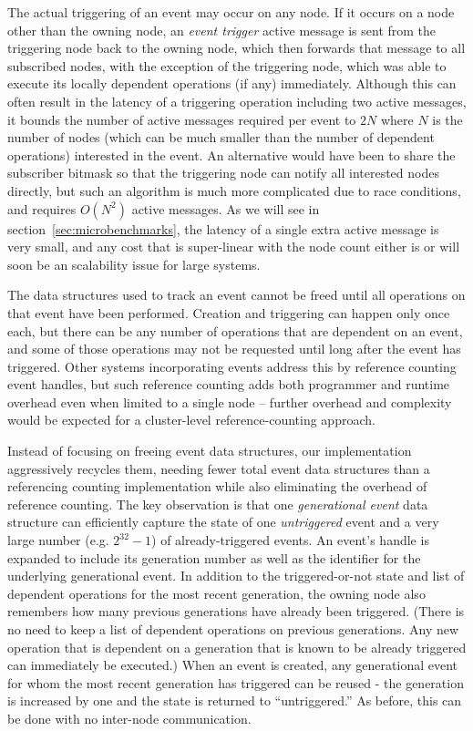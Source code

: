 The actual triggering of an event may occur on any node.  If it occurs on a node other than the owning
node, an {\em event trigger} active message is sent from the triggering node back to the owning node, which
then forwards that message to all subscribed nodes, with the exception of the triggering node, which was
able to execute its locally dependent operations (if any) immediately.  Although this can often result in
the latency of a triggering operation including two active messages, it bounds the number of active
messages required per event to $2N$ where $N$ is the number of nodes (which can be much smaller than the
number of dependent operations) interested in the event.  An alternative
would have been to share the subscriber bitmask so that the triggering node can notify all interested
nodes directly, but such an algorithm is much more complicated due to race conditions, and requires $O(N^2)$
active messages.  As we will see in section~\ref{sec:microbenchmarks}, the latency of a single extra
active message is very small, and any cost that is super-linear with the node count either is or will soon
be an scalability issue for large systems.

The data structures used to track an event cannot be freed until all operations on that event have been
performed.  Creation and triggering can happen only once each, but there can be any number of operations
that are dependent on an event, and some of those operations may not be requested until long after the
event has triggered.  Other systems incorporating events address this by reference counting event
handles\cite{Khronos:OpenCL}, but such reference counting adds both programmer and runtime overhead even when
limited to a single node -- further overhead and complexity would be expected for a cluster-level
reference-counting approach.

Instead of focusing on freeing event data structures, our implementation aggressively recycles them, 
needing fewer total event data structures than a referencing counting implementation while also eliminating
the overhead of reference counting.  The key observation is that one {\em generational event} data structure
 can efficiently capture the state of one {\em untriggered} event and a very large number (e.g. $2^{32}-1$)
of already-triggered events.  An event's handle is expanded to include its generation number as well as the
identifier for the underlying generational event.  In addition to the triggered-or-not state and list of
dependent operations
for the most recent generation, the owning node also remembers how many previous generations have already
been triggered.  (There is no need to keep a list of dependent operations on previous generations.  Any
new operation that is dependent on a generation that is known to be already triggered can immediately be
executed.)  When an event is created, any generational event for whom the most recent generation has 
triggered can be reused - the generation is increased by one and the state is returned to ``untriggered.''
As before, this can be done with no inter-node communication.

